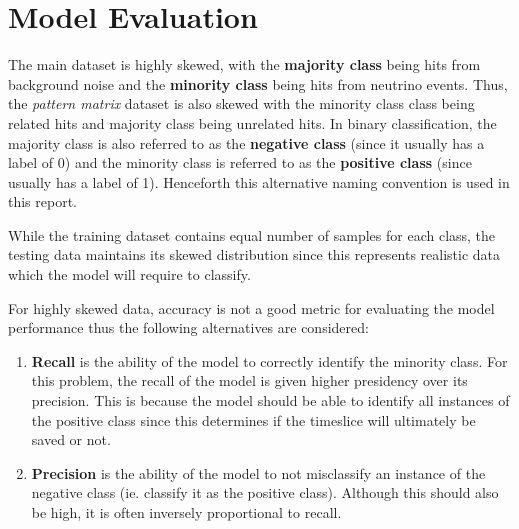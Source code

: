 
\section{Model Evaluation}
The main dataset is highly skewed, with the \textbf{majority class}
being hits from background noise and the \textbf{minority class} being
hits from neutrino events. Thus, the \textit{pattern matrix} dataset
is also skewed with the minority class class being related hits and
majority class being unrelated hits. In binary classification, the
majority class is also referred to as the \textbf{negative class}
(since it usually has a label of 0) and the minority class is referred
to as the \textbf{positive class} (since usually has a label of 1).
Henceforth this alternative naming convention is used in this report.

While the training dataset contains equal number of samples for each
class, the testing data maintains its skewed distribution since this
represents realistic data which the model will require to classify.

For highly skewed data, accuracy is not a good metric for evaluating
the model performance \cite{branco2015survey} thus the following
alternatives are considered:

\begin{enumerate}
\item \textbf{Recall} is the ability of the model to correctly
  identify the minority class. For this problem, the recall of the
  model is given higher presidency over its precision. This is because
  the model should be able to identify all instances of the positive
  class since this determines if the timeslice will ultimately be
  saved or not.
\item \textbf{Precision} is the ability of the model to not
  misclassify an instance of the negative class (ie. classify it as
  the positive class). Although this should also be high, it is often
  inversely proportional to recall.
\end{enumerate}
